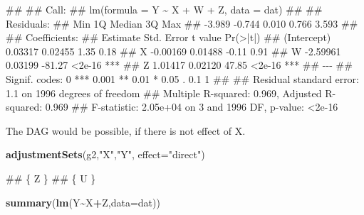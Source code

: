 \documentclass[
]{book}
\newenvironment{Shaded}{\begin{snugshade}}{\end{snugshade}}
\newcommand{\AttributeTok}[1]{\textcolor[rgb]{0.13,0.29,0.53}{#1}}
\newcommand{\FunctionTok}[1]{\textcolor[rgb]{0.13,0.29,0.53}{\textbf{#1}}}
\newcommand{\NormalTok}[1]{#1}
\newcommand{\SpecialCharTok}[1]{\textcolor[rgb]{0.81,0.36,0.00}{\textbf{#1}}}
\newcommand{\StringTok}[1]{\textcolor[rgb]{0.31,0.60,0.02}{#1}}
\begin{document}
\begin{Shaded}
\begin{Highlighting}[]
\NormalTok{\#\# }
\NormalTok{\#\# Call:}
\NormalTok{\#\# lm(formula = Y \textasciitilde{} X + W + Z, data = dat)}
\NormalTok{\#\# }
\NormalTok{\#\# Residuals:}
\NormalTok{\#\#    Min     1Q Median     3Q    Max }
\NormalTok{\#\# {-}3.989 {-}0.744  0.010  0.766  3.593 }
\NormalTok{\#\# }
\NormalTok{\#\# Coefficients:}
\NormalTok{\#\#             Estimate Std. Error t value Pr(\textgreater{}|t|)    }
\NormalTok{\#\# (Intercept)  0.03317    0.02455    1.35     0.18    }
\NormalTok{\#\# X           {-}0.00169    0.01488   {-}0.11     0.91    }
\NormalTok{\#\# W           {-}2.59961    0.03199  {-}81.27   \textless{}2e{-}16 ***}
\NormalTok{\#\# Z            1.01417    0.02120   47.85   \textless{}2e{-}16 ***}
\NormalTok{\#\# {-}{-}{-}}
\NormalTok{\#\# Signif. codes:  0 \textquotesingle{}***\textquotesingle{} 0.001 \textquotesingle{}**\textquotesingle{} 0.01 \textquotesingle{}*\textquotesingle{} 0.05 \textquotesingle{}.\textquotesingle{} 0.1 \textquotesingle{} \textquotesingle{} 1}
\NormalTok{\#\# }
\NormalTok{\#\# Residual standard error: 1.1 on 1996 degrees of freedom}
\NormalTok{\#\# Multiple R{-}squared:  0.969,  Adjusted R{-}squared:  0.969 }
\NormalTok{\#\# F{-}statistic: 2.05e+04 on 3 and 1996 DF,  p{-}value: \textless{}2e{-}16}
\end{Highlighting}
\end{Shaded}

The DAG would be possible, if there is not effect of X.

\begin{Shaded}
\begin{Highlighting}[]
\FunctionTok{adjustmentSets}\NormalTok{(g2,}\StringTok{"X"}\NormalTok{,}\StringTok{"Y"}\NormalTok{, }\AttributeTok{effect=}\StringTok{"direct"}\NormalTok{)}
\end{Highlighting}
\end{Shaded}

\begin{Shaded}
\begin{Highlighting}[]
\NormalTok{\#\# \{ Z \}}
\NormalTok{\#\# \{ U \}}
\end{Highlighting}
\end{Shaded}

\begin{Shaded}
\begin{Highlighting}[]
\FunctionTok{summary}\NormalTok{(}\FunctionTok{lm}\NormalTok{(Y}\SpecialCharTok{\textasciitilde{}}\NormalTok{X}\SpecialCharTok{+}\NormalTok{Z,}\AttributeTok{data=}\NormalTok{dat))}
\end{Highlighting}
\end{Shaded}
\end{document}

